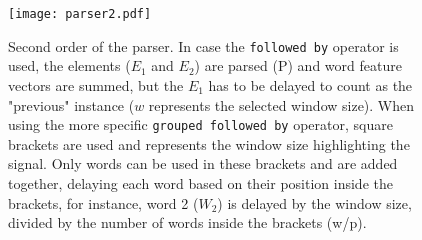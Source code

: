 \begin{figure}
\centering
\texttt{[image: parser2.pdf]}
\label{fig:parser2}
\caption{Second order of the parser. In case the \texttt{followed by} operator is used, the elements ($E_1$ and $E_2$) are parsed (P) and word feature vectors are summed, but the $E_1$ has to be delayed to count as the "previous" instance ($w$ represents the selected window size). When using the more specific \texttt{grouped followed by} operator, square brackets are used and represents the window size highlighting the signal. Only words can be used in these brackets and are added together, delaying each word based on their position inside the brackets, for instance, word 2 ($W_2$) is delayed by the window size, divided by the number of words inside the brackets (w/p).}
\end{figure}

